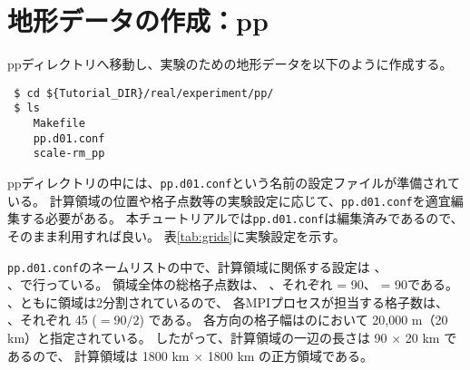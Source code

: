\section{地形データの作成：pp} \label{sec:tutorial_real_pp}

ppディレクトリへ移動し、実験のための地形データを以下のように作成する。
\begin{verbatim}
 $ cd ${Tutorial_DIR}/real/experiment/pp/
 $ ls
    Makefile
    pp.d01.conf
    scale-rm_pp
\end{verbatim}
ppディレクトリの中には、\verb|pp.d01.conf|という名前の設定ファイルが準備されている。
計算領域の位置や格子点数等の実験設定に応じて、\verb|pp.d01.conf|を適宜編集する必要がある。
本チュートリアルでは\verb|pp.d01.conf|は編集済みであるので、そのまま利用すれば良い。
表\ref{tab:grids}に実験設定を示す。

\verb|pp.d01.conf|のネームリストの中で、計算領域に関係する設定は 、\\
、で行っている。
領域全体の総格子点数は、{\XDIR} 、{\YDIR}それぞれ  = 90、 = 90である。
{\XDIR} 、{\YDIR}ともに領域は2分割されているので、
各MPIプロセスが担当する格子数は、{\XDIR} 、{\YDIR}それぞれ 45 ($=90 / 2$) である。
各方向の格子幅はのにおいて 20,000 m（20 km）と指定されている。
したがって、計算領域の一辺の長さは 90 $\times$ 20 km であるので、
計算領域は 1800 km $\times$ 1800 km の正方領域である。

